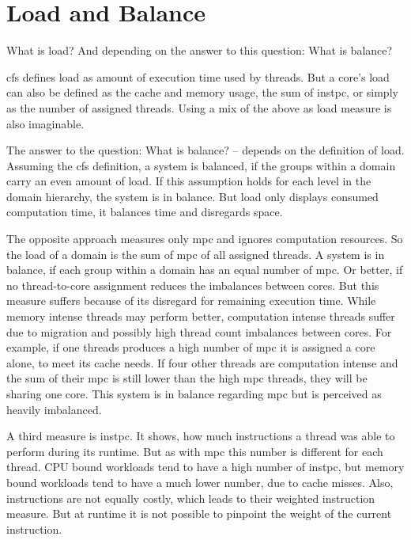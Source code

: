 \section{Load and Balance}
\label{design:load}


What is load?
And depending on the answer to this question: What is balance?

\gls{cfs} defines load as amount of execution time used by threads.
But a core's load can also be defined as
the cache and memory usage, the sum of \gls{instpc}, or simply as the number of
assigned threads.
Using a mix of the above as load measure is also imaginable.

The answer to the question: What is balance? -- depends on the definition of
load.
Assuming the \gls{cfs} definition, a system is balanced, if the groups within a
domain carry an even amount of load.
If this assumption holds for each level in the domain hierarchy, the system is
in balance.
But load only displays consumed computation time, it balances time and
disregards space.

The opposite approach measures only \gls{mpc} and ignores computation
resources.
So the load of a domain is the sum of \gls{mpc} of all assigned threads.
A system is in balance, if each group within a domain has an equal number of
\gls{mpc}.
Or better, if no thread-to-core assignment reduces the imbalances between cores.
But this measure suffers because of its disregard for remaining execution time.
While memory intense threads may perform better, computation intense threads
suffer due to migration and possibly high thread count imbalances between
cores.
For example, if one threads produces a high number of \gls{mpc} it is assigned a
core alone, to meet its cache needs.
If four other threads are computation intense and the sum of their \gls{mpc} is
still lower than the high \gls{mpc} threads, they will be sharing one core.
This system is in balance regarding \gls{mpc} but is perceived as heavily
imbalanced.

A third measure is \gls{instpc}.
It shows, how much instructions a thread was able to perform during its
runtime.
But as with \gls{mpc} this number is different for each thread.
CPU bound workloads tend to have a high number of \gls{instpc},
but memory bound workloads tend to have a much lower number, due to cache
misses.
Also, instructions are not equally costly, which leads
\citeauthor{snavely_symbiotic_2000} to their weighted instruction measure.
But at runtime it is not possible to pinpoint the weight of the current
instruction.

